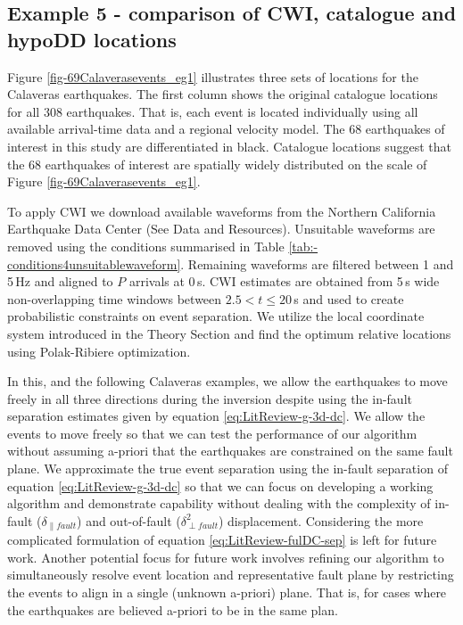 \documentclass[12pt,double]{article}
\begin{document}
\subsection*{Example 5 - comparison of CWI, catalogue and hypoDD locations}

Figure \ref{fig-69Calaverasevents_eg1} illustrates three sets of
locations for the Calaveras earthquakes. The first column shows the
original catalogue locations for all 308 earthquakes. That is, each event
is located individually using all available arrival-time data and
a regional velocity model. The 68 earthquakes of interest in this
study are differentiated in black. Catalogue locations suggest that
the 68 earthquakes of interest are spatially widely distributed on the scale of
 Figure \ref{fig-69Calaverasevents_eg1}.

To apply CWI we download available waveforms from the Northern
California Earthquake Data Center (See Data and Resources).
Unsuitable waveforms are removed using the conditions summarised in
Table \ref{tab:-conditions4unsuitablewaveform}. Remaining waveforms
are filtered between 1 and 5\,Hz and aligned  to $P$ arrivals at
0\,s. CWI estimates are obtained from 5\,s wide non-overlapping time
windows between $2.5 < t \leq 20$\,s and used to create
probabilistic constraints on event separation. We utilize the
local coordinate system introduced in the Theory Section and find the
optimum relative locations using Polak-Ribiere optimization.

In this, and the following Calaveras examples, we allow the earthquakes to 
move freely in all three directions during the inversion despite using the 
in-fault separation estimates given by equation \ref{eq:LitReview-g-3d-dc}.
We allow the events to move freely so that we can test the 
performance of our algorithm without assuming a-priori 
that the earthquakes are constrained on the same fault plane. 
We approximate the true event separation using the in-fault separation 
of equation \ref{eq:LitReview-g-3d-dc} so that we can focus on developing 
a working algorithm and demonstrate capability 
without dealing with the complexity of 
in-fault ($\delta_{\| fault}$) and out-of-fault 
($\delta_{\perp fault}^2$) displacement. Considering 
the more complicated formulation of equation \ref{eq:LitReview-fulDC-sep} is
left for future work. Another potential focus for future work 
involves refining our algorithm  
to simultaneously resolve event location and representative fault plane 
by restricting the events to align in a single (unknown a-priori) plane. 
That is, for cases where the earthquakes are 
believed a-priori to be in the same plan.
\end{document}
